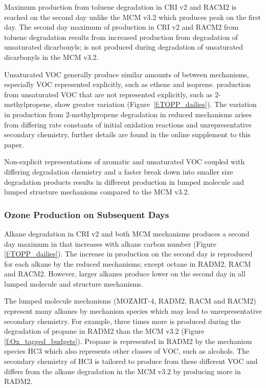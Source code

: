 Maximum  production from toluene degradation in CRI v2 and RACM2 is reached on the second day unlike the MCM v3.2 which produces peak  on the first day.
The second day maximum of  production in CRI v2 and RACM2 from toluene degradation results from increased  production from degradation of unsaturated dicarbonyls;  is not produced during degradation of unsaturated dicarbonyls in the MCM v3.2.

Unsaturated VOC generally produce similar amounts of  between mechanisms, especially VOC represented explicitly, such as ethene and isoprene.
 production from unsaturated VOC that are not represented explicitly, such as $2$-methylpropene, show greater variation \mbox{(Figure \ref{f:TOPP_dailies}).}
The variation in  production from $2$-methylpropene degradation in reduced mechanisms arises from differing rate constants of initial oxidation reactions and unrepresentative secondary chemistry, further details are found in the online supplement to this paper.

Non-explicit representations of aromatic and unsaturated VOC coupled with differing degradation chemistry and a faster break down into smaller size degradation products results in different  production in lumped molecule and lumped structure mechanisms compared to the MCM v3.2.
%
\subsubsection{Ozone Production on Subsequent Days} \label{sss:profiles} %
%
Alkane degradation in CRI v2 and both MCM mechanisms produces a second day maximum in  that increases with alkane carbon number (Figure \ref{f:TOPP_dailies}).
The increase in  production on the second day is reproduced for each alkane by the reduced mechanisms; except octane in RADM2, RACM and RACM2.
However, larger alkanes produce lower  on the second day in all lumped molecule and structure mechanisms.

The lumped molecule mechanisms (MOZART-4, RADM2, RACM and RACM2) represent many alkanes by mechanism species which may lead to unrepresentative secondary chemistry.
For example, three times more  is produced during the degradation of propane in RADM2 than the MCM v3.2 (Figure \ref{f:Ox_tagged_budgets}).
Propane is represented in RADM2 by the mechanism species HC3 which also represents other classes of VOC, such as alcohols.
The secondary chemistry of HC3 is tailored to produce  from these different VOC and differs from the alkane degradation in the MCM v3.2 by producing more  in RADM2.

